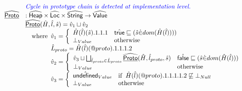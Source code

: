\[\begin{array}{ll}
& {\color{blue} \textit{Cycle in prototype chain is detected at implementation level.}} \\
\widehat{\underline{\sf Proto}} & : \widehat{\mbox{\textsf{Heap}}} \times \widehat{\mbox{\textsf{Loc}}} \times \widehat{\mbox{\textsf{String}}} \rightarrow \widehat{\mbox{\textsf{Value}}}\\
  & \widehat{\underline{\sf Proto}}(\hat{H},\hat{l},\hat{s})
    =\hat{v}_1\sqcup\hat{v}_2\\
  & \quad{\rm where}\begin{array}[t]{l}
     \hat{v}_1 =
        \left\{
          \begin{array}{ll}
            \hat{H}(\hat{l})(\hat{s}).1.1.1
            & \hat{\mbox{\textsf{true}}}\sqsubseteq(\hat{s} \dot{\in} dom(\hat{H}(\hat{l}))))\\
            \bot_{Value} & {\rm otherwise} \\
          \end{array}
        \right.\\
      \hat{L}_{proto} = \hat{H}(\hat{l})(@proto).1.1.1.2\\
      \hat{v}_2 =
        \left\{
          \begin{array}{ll}
            \hat{v}_3 \sqcup \bigsqcup_{\hat{l}_{proto}\in\hat{L}_{proto}}\widehat{\underline{\sf Proto}}(\hat{H},\hat{l}_{proto},\hat{s})
            & \hat{\mbox{\textsf{false}}}\sqsubseteq(\hat{s} \dot{\in} dom(\hat{H}(\hat{l})))\\
            \bot_{Value} & {\rm otherwise} \\
          \end{array}
        \right.\\
    \hat{v}_3 =
      \left\{
      \begin{array}{ll}
        \hat{\mbox{\textsf{undefined}}}_{Value} & {\rm if}\begin{array}[t]{l}\hat{H}(\hat{l})(@proto).1.1.1.1.2 \not\sqsubseteq \bot_{Null}\end{array}\\
        \bot_{Value} & {\rm otherwise}\\
      \end{array}
    \right.\\
    \end{array}\\
\\


\end{array}\]

